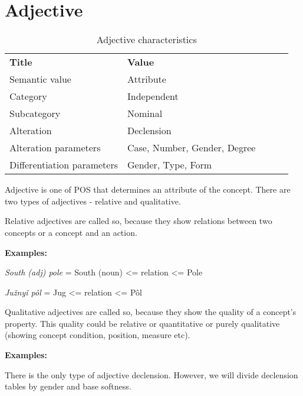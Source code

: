\section{Adjective}

\begin{table}[h]
	\caption{Adjective characteristics}
	\begin{tabular}{lllll}
		\textbf{Title}              & \textbf{Value}               \\
		Semantic value              & Attribute                    \\
		Category                    & Independent                  \\
		Subcategory                 & Nominal                      \\
		Alteration                  & Declension                   \\
		Alteration parameters       & Case, Number, Gender, Degree \\
		Differentiation parameters  & Gender, Type, Form
	\end{tabular}
\end{table}

Adjective is one of POS that determines an attribute of the concept. There are two types of adjectives - relative and qualitative. 

Relative adjectives are called so, because they show relations between two concepts or a concept and an action.

\textbf{Examples:}

\textit{South (adj) pole} = South (noun) <= relation <= Pole

\textit{Južnyǐ pôl} = Jug <= relation <= Pôl

Qualitative adjectives are called so, because they show the quality of a concept’s property. This quality could be relative or quantitative or purely qualitative (showing concept condition, position, measure etc).

\textbf{Examples:}

There is the only type of adjective declension. However, we will divide declension tables by gender and base softness.

